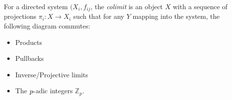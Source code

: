 \begin{definition}[Colimit]

For a directed system \((X_i, f_{ij}\), the \emph{colimit} is an object
\(X\) with a sequence of projections \(\pi_i:X\to X_i\) such that for
any \(Y\) mapping into the system, the following diagram commutes:

\begin{center}
\end{center}

\begin{example}

\begin{itemize}
\tightlist
\item
  Products
\item
  Pullbacks
\item
  Inverse/Projective limits
\item
  The \(p{\hbox{-}}\)adic integers \({\mathbb{Z}}_p\).
\end{itemize}

\end{example}

\end{definition}

